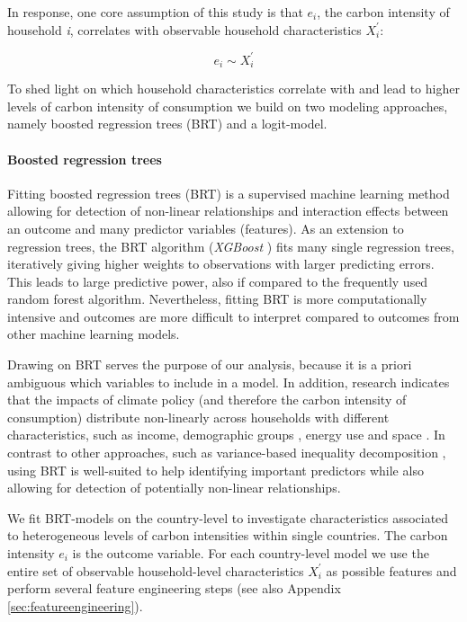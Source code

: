 \documentclass[12pt, a4paper]{article}
\begin{document}
In response, one core assumption of this study is that $e_{i}$, the carbon intensity of household \textit{i}, correlates with observable household characteristics $X_{i}^{'}$:

\begin{equation}
    e_{i} \sim X_{i}^{'}
\end{equation}


To shed light on which household characteristics correlate with and lead to higher levels of carbon intensity of consumption we build on two modeling approaches, namely boosted regression trees (BRT) and a logit-model.

\paragraph{Boosted regression trees} Fitting boosted regression trees (BRT) \autocite{Friedman.2003, Elith.2008} is a supervised machine learning method allowing for detection of non-linear relationships and interaction effects between an outcome and many predictor variables (features). As an extension to regression trees, the BRT algorithm (\textit{XGBoost} \autocite{Chen.2016}) fits many single regression trees, iteratively giving higher weights to observations with larger predicting errors. This leads to large predictive power, also if compared to the frequently used random forest algorithm. Nevertheless, fitting BRT is more computationally intensive and outcomes are more difficult to interpret compared to outcomes from other machine learning models. %

Drawing on BRT serves the purpose of our analysis, because it is a priori ambiguous which variables to include in a model. In addition, research indicates that the impacts of climate policy (and therefore the carbon intensity of consumption) distribute non-linearly across households with different characteristics, such as income, demographic groups \autocite{Missbach.2023}, energy use \autocite{Farrell.2017} and space \autocite{Chan.2023}. In contrast to other approaches, such as variance-based inequality decomposition \autocite{Farrell.2017,Sager.2019b,Missbach.2024}, using BRT is well-suited to help identifying important predictors while also allowing for detection of potentially non-linear relationships.

We fit BRT-models on the country-level to investigate characteristics associated to heterogeneous levels of carbon intensities within single countries. The carbon intensity $e_{i}$ is the outcome variable. For each country-level model we use the entire set of observable household-level characteristics $X_{i}^{'}$ as possible features and perform several feature engineering steps (see also Appendix \ref{sec:featureengineering}).
\end{document}
